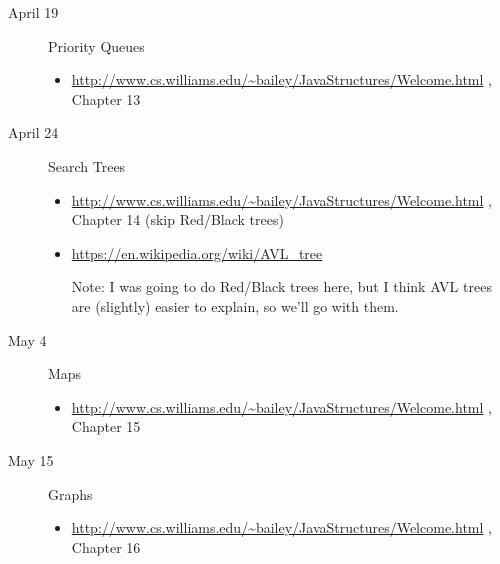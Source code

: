 \documentclass{article}
\newcommand{\bailey}{
  \url{http://www.cs.williams.edu/~bailey/JavaStructures/Welcome.html}
  }
\begin{document}
\begin{description}
\item[April 19] Priority Queues
  \begin{itemize}
  \item \bailey, Chapter 13
  \end{itemize}

\item[April 24] Search Trees
  \begin{itemize}
  \item \bailey, Chapter 14 (skip Red/Black trees)
\item \url{https://en.wikipedia.org/wiki/AVL_tree}

  Note:  I was going to do Red/Black trees here, but I think
  AVL trees are (slightly) easier to explain, so we'll go with them.
  \end{itemize}

\item[May 4] Maps
  \begin{itemize}
  \item \bailey, Chapter 15
  \end{itemize}

\item[May 15] Graphs
  \begin{itemize}
  \item \bailey, Chapter 16
  \end{itemize}
  

\end{description}
\end{document}
